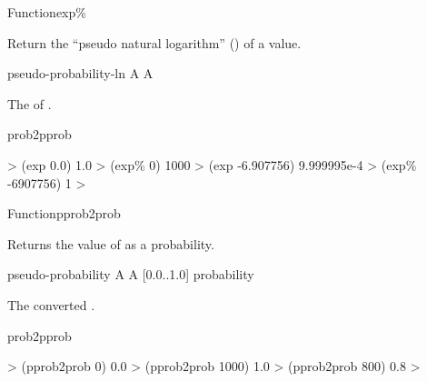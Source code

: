 \documentclass[10pt,twoside,english,pdftex]{article}
\begin{document}
\begin{functiondoc}{Function}{exp\%}%
  {
    \returns{} }

\fnsyntax

\fnpurpose Return the ``pseudo natural logarithm''
() of a  value.

\fnpackage {}

\fnmodule {}

\fnargs
\begin{args}{pseudo-probability-ln}
 A  
 A  
\end{args}

\fnreturns The   of
.

\begin{alsos}{prob2pprob}
\also[ln\%]
\end{alsos}

\fnexamples
\begin{example}
%
\W\supp
  > (exp 0.0)
  1.0
  > (exp\% 0)
  1000
  > (exp -6.907756)
  9.999995e-4
  > (exp\% -6907756)
  1
  >
\end{example}

\end{functiondoc}


\begin{functiondoc}{Function}{pprob2prob}%
  { \returns{} }
%
%

\fnsyntax

\fnpurpose Returns the value of  as a
probability.

\fnpackage {}

\fnmodule {}

\fnargs
\begin{args}{pseudo-probability}
 A  
\arg[probability] A [0.0..1.0] probability
\end{args}

\fnreturns The converted .

\begin{alsos}{prob2pprob}
\end{alsos}

\fnexamples
\begin{example}
%
\W\supp
  > (pprob2prob 0)
  0.0
  > (pprob2prob 1000)
  1.0
  > (pprob2prob 800)
  0.8
  > 
\end{example}

\end{functiondoc}
\end{document}
